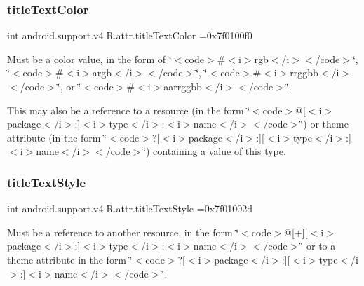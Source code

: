 \subsubsection{\texorpdfstring{title\+Text\+Color}{titleTextColor}}
{\footnotesize\ttfamily int android.\+support.\+v4.\+R.\+attr.\+title\+Text\+Color =0x7f0100f0\hspace{0.3cm}{\ttfamily [static]}}

Must be a color value, in the form of \char`\"{}$<$code$>$\#$<$i$>$rgb$<$/i$>$$<$/code$>$\char`\"{}, \char`\"{}$<$code$>$\#$<$i$>$argb$<$/i$>$$<$/code$>$\char`\"{}, \char`\"{}$<$code$>$\#$<$i$>$rrggbb$<$/i$>$$<$/code$>$\char`\"{}, or \char`\"{}$<$code$>$\#$<$i$>$aarrggbb$<$/i$>$$<$/code$>$\char`\"{}. 

This may also be a reference to a resource (in the form \char`\"{}$<$code$>$@\mbox{[}$<$i$>$package$<$/i$>$\+:\mbox{]}$<$i$>$type$<$/i$>$\+:$<$i$>$name$<$/i$>$$<$/code$>$\char`\"{}) or theme attribute (in the form \char`\"{}$<$code$>$?\mbox{[}$<$i$>$package$<$/i$>$\+:\mbox{]}\mbox{[}$<$i$>$type$<$/i$>$\+:\mbox{]}$<$i$>$name$<$/i$>$$<$/code$>$\char`\"{}) containing a value of this type. \mbox{\label{classandroid_1_1support_1_1v4_1_1R_1_1attr_a504cda790d3f21fe9a084bf909d83e9a}} 
\subsubsection{\texorpdfstring{title\+Text\+Style}{titleTextStyle}}
{\footnotesize\ttfamily int android.\+support.\+v4.\+R.\+attr.\+title\+Text\+Style =0x7f01002d\hspace{0.3cm}{\ttfamily [static]}}

Must be a reference to another resource, in the form \char`\"{}$<$code$>$@\mbox{[}+\mbox{]}\mbox{[}$<$i$>$package$<$/i$>$\+:\mbox{]}$<$i$>$type$<$/i$>$\+:$<$i$>$name$<$/i$>$$<$/code$>$\char`\"{} or to a theme attribute in the form \char`\"{}$<$code$>$?\mbox{[}$<$i$>$package$<$/i$>$\+:\mbox{]}\mbox{[}$<$i$>$type$<$/i$>$\+:\mbox{]}$<$i$>$name$<$/i$>$$<$/code$>$\char`\"{}. \mbox{\label{classandroid_1_1support_1_1v4_1_1R_1_1attr_a9a14427b7f59c731ec884ed181ef9390}} 
